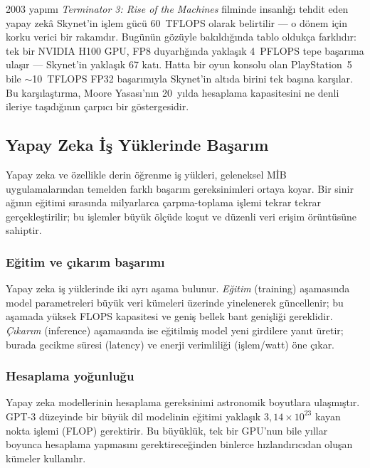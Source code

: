 \begin{bilginot}
2003 yapımı \emph{Terminator 3: Rise of the Machines} filminde insanlığı tehdit eden yapay zekâ Skynet'in işlem gücü 60~TFLOPS olarak belirtilir --- o dönem için korku verici bir rakamdır. Bugünün gözüyle bakıldığında tablo oldukça farklıdır: tek bir NVIDIA H100 GPU, FP8 duyarlığında yaklaşık 4~PFLOPS tepe başarıma ulaşır --- Skynet'in yaklaşık 67 katı. Hatta bir oyun konsolu olan PlayStation~5 bile $\sim$10~TFLOPS FP32 başarımıyla Skynet'in altıda birini tek başına karşılar. Bu karşılaştırma, Moore Yasası'nın 20~yılda hesaplama kapasitesini ne denli ileriye taşıdığının çarpıcı bir göstergesidir.
\end{bilginot}

\subsection{Yapay Zeka İş Yüklerinde Başarım}
\label{subsec:yz-basarim}

Yapay zeka ve özellikle derin öğrenme iş yükleri, geleneksel MİB uygulamalarından temelden farklı başarım gereksinimleri ortaya koyar. Bir sinir ağının eğitimi sırasında milyarlarca çarpma-toplama işlemi tekrar tekrar gerçekleştirilir; bu işlemler büyük ölçüde koşut ve düzenli veri erişim örüntüsüne sahiptir.

\subsubsection*{Eğitim ve çıkarım başarımı}
Yapay zeka iş yüklerinde iki ayrı aşama bulunur. \emph{Eğitim} (training) aşamasında model parametreleri büyük veri kümeleri üzerinde yinelenerek güncellenir; bu aşamada yüksek FLOPS kapasitesi ve geniş bellek bant genişliği gereklidir. \emph{Çıkarım} (inference) aşamasında ise eğitilmiş model yeni girdilere yanıt üretir; burada gecikme süresi (latency) ve enerji verimliliği (işlem/watt) öne çıkar.

\subsubsection*{Hesaplama yoğunluğu}
Yapay zeka modellerinin hesaplama gereksinimi astronomik boyutlara ulaşmıştır. GPT-3 düzeyinde bir büyük dil modelinin eğitimi yaklaşık $3{,}14 \times 10^{23}$ kayan nokta işlemi (FLOP) gerektirir. Bu büyüklük, tek bir GPU'nun bile yıllar boyunca hesaplama yapmasını gerektireceğinden binlerce hızlandırıcıdan oluşan kümeler kullanılır.

